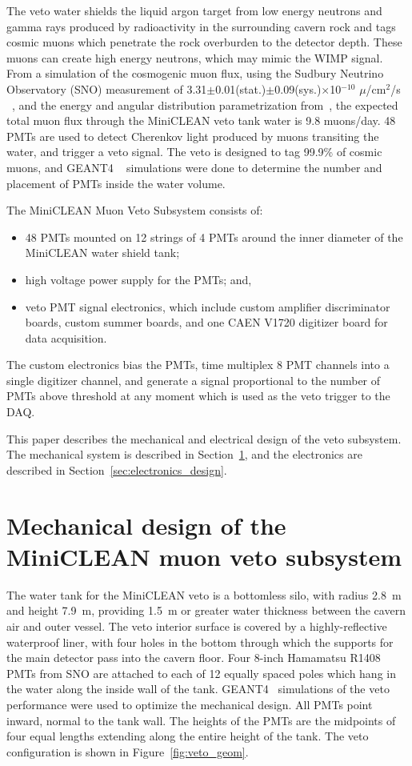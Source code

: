 \documentclass[review,number,sort&compress]{elsarticle}
\begin{document}
The veto water shields the liquid argon target from low energy neutrons and gamma
rays produced by radioactivity in the surrounding cavern rock and tags cosmic muons
which penetrate the rock overburden to the detector depth. These muons can
create high energy neutrons, which may mimic the WIMP signal.
From a simulation of the cosmogenic muon flux, using the Sudbury Neutrino Observatory (SNO) measurement of
3.31$\pm$0.01(stat.)$\pm$0.09(sys.)$\times$10$^{-10}$ $\mu$/cm$^2$/s
~\cite{ref:sno_muon_flux}, and the energy and angular distribution
parametrization from~\cite{ref:mei_and_hime}, the expected total muon flux
through the MiniCLEAN veto tank water is 9.8 muons/day. 48 PMTs are used to
detect Cherenkov light produced by muons transiting the water, and trigger a
veto signal. The veto is designed to tag 99.9\% of cosmic muons, and GEANT4
~\cite{ref:geant4} simulations were done to determine the number and placement
of PMTs inside the water volume. 

The MiniCLEAN Muon Veto Subsystem consists of:
\begin{itemize}
\item 48 PMTs mounted on 12 strings of 4 PMTs around the inner diameter of the MiniCLEAN water shield tank;
\item high voltage power supply for the PMTs; and,
\item veto PMT signal electronics, which include custom amplifier discriminator boards, custom summer boards, and one CAEN V1720 digitizer board for data acquisition. 
\end{itemize}
The custom electronics bias the PMTs, time multiplex 8 PMT channels into a
single digitizer channel, and generate a signal proportional to the number
of PMTs above threshold at any moment which is used as the veto trigger to
the DAQ.

This paper describes the mechanical and electrical design of the veto
subsystem. The mechanical system is described in
Section~\ref{sec:subsystem_design}, and the electronics are
described in Section~\ref{sec:electronics_design}.


\section{Mechanical design of the MiniCLEAN muon veto subsystem}
\label{sec:subsystem_design}
%
The water tank for the MiniCLEAN veto is a bottomless silo, with
radius 2.8~m and height 7.9~m, providing 1.5~m or greater
water thickness between the cavern air and outer vessel. The veto
interior surface is covered by a highly-reflective waterproof liner,
with four holes in the bottom through which the supports for the main
detector pass into the cavern floor. Four 8-inch Hamamatsu R1408 PMTs
from SNO are attached to each of 12 equally spaced poles which hang in
the water along the inside wall of the tank. GEANT4~\cite{ref:geant4}
simulations of the veto performance were used to optimize the
mechanical design. All PMTs point inward, normal to the tank wall. The
heights of the PMTs are the midpoints of four equal lengths extending
along the entire height of the tank. The veto configuration is shown
in Figure~\ref{fig:veto_geom}.
\end{document}
